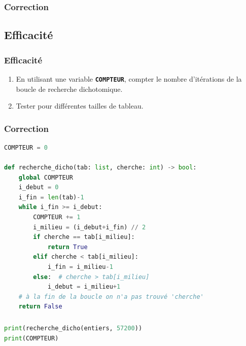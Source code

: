 \documentclass[svgnames,11pt]{beamer}
\begin{document}
\begin{frame}
    \frametitle{Correction}

    

\end{frame}
\subsection{Efficacité}
\begin{frame}
    \frametitle{Efficacité}

    \begin{activite}
        \begin{enumerate}
            \item En utilisant une variable \textbf{\texttt{COMPTEUR}}, compter le nombre d'itérations de la boucle de recherche dichotomique.
            \item Tester pour différentes tailles de tableau.
        \end{enumerate}
        \end{activite}

\end{frame}
\begin{frame}[fragile]
    \frametitle{Correction}

\begin{center}
\begin{lstlisting}[language=Python , basicstyle=\ttfamily\small, xleftmargin=0.2em, xrightmargin=-1.7em]
COMPTEUR = 0

def recherche_dicho(tab: list, cherche: int) -> bool:
    global COMPTEUR
    i_debut = 0
    i_fin = len(tab)-1
    while i_fin >= i_debut:
        COMPTEUR += 1
        i_milieu = (i_debut+i_fin) // 2
        if cherche == tab[i_milieu]:
            return True
        elif cherche < tab[i_milieu]:
            i_fin = i_milieu-1
        else:  # cherche > tab[i_milieu]
            i_debut = i_milieu+1
    # à la fin de la boucle on n'a pas trouvé 'cherche'
    return False
\end{lstlisting}
\end{center}

\end{frame}
\begin{frame}[fragile]
    \frametitle{}

\begin{center}
\begin{lstlisting}[language=Python , basicstyle=\ttfamily\small, xleftmargin=2em, xrightmargin=2em]
print(recherche_dicho(entiers, 57200))
print(COMPTEUR)
\end{lstlisting}
\label{CODE}
\end{center}

\end{frame}
\end{document}
